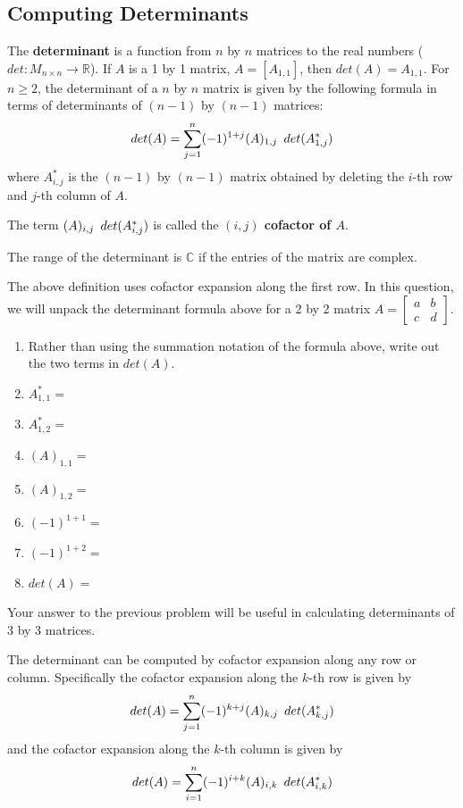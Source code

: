 \subsection{Computing Determinants}
\begin{definition}
The \textbf{determinant} is a function from $n$ by $n$ matrices to the real numbers ($det:M_{n \times n} \rightarrow \mathbb{R}$). If $A$ is a 1 by 1 matrix, $A=[A_{1,1}]$, then $det(A)=A_{1,1}$. For $n \geq 2$, the determinant of a $n$ by $n$ matrix is given by the following formula in terms of determinants of $(n-1)$ by $(n-1)$ matrices:
$$det(A)=\sum_{j=1}^n (-1)^{1+j} (A)_{1,j} \enskip det(A^*_{1,j})$$
where $A^*_{i,j}$ is the $(n-1)$ by $(n-1)$ matrix obtained by deleting the $i$-th row and $j$-th column of $A$.

The term $(A)_{i,j}\enskip det(A^*_{i,j})$ is called the \textbf{$(i,j)$ cofactor of $A$}.

The range of the determinant is $\mathbb{C}$ if the entries of the matrix are complex.
\end{definition}
The above definition uses cofactor expansion along the first row.
\bq In this question, we will unpack the determinant formula above for a 2 by 2 matrix $A=\begin{bmatrix} a&b \\c&d \end{bmatrix}$.
\begin{enumerate}
\item Rather than using the summation notation of the formula above, write out the two terms in $det(A)$.
\item $A^*_{1,1}=$
\item $A^*_{1,2}=$
\item $(A)_{1,1}=$
\item $(A)_{1,2}=$
\item $(-1)^{1+1}=$
\item $(-1)^{1+2}=$
\item $det(A)=$
\end{enumerate}
\eq
Your answer to the previous problem will be useful in calculating determinants of 3 by 3 matrices.
\begin{theorem}
The determinant can be computed by cofactor expansion along any row or column. Specifically the cofactor expansion along the $k$-th row is given by $$det(A)=\sum_{j=1}^n (-1)^{k+j} (A)_{k,j} \enskip det(A^*_{k,j})$$
and the cofactor expansion along the $k$-th column is given by
$$det(A)=\sum_{i=1}^n (-1)^{i+k} (A)_{i,k} \enskip det(A^*_{i,k})$$
\end{theorem}

